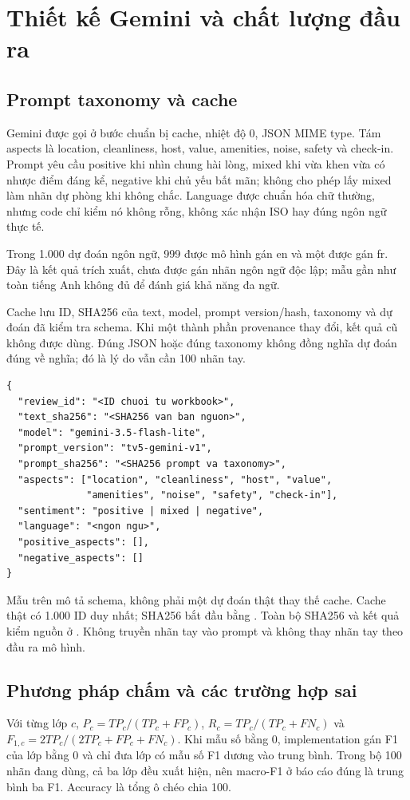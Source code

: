 \documentclass[11pt,a4paper]{article}
\begin{document}
\clearpage
\section{Thiết kế Gemini và chất lượng đầu ra}
\subsection{Prompt taxonomy và cache}
Gemini  được gọi ở bước chuẩn bị cache, nhiệt độ 0, JSON MIME type. Tám aspects là location, cleanliness, host, value, amenities, noise, safety và check-in. Prompt yêu cầu positive khi nhìn chung hài lòng, mixed khi vừa khen vừa có nhược điểm đáng kể, negative khi chủ yếu bất mãn; không cho phép lấy mixed làm nhãn dự phòng khi không chắc. Language được chuẩn hóa chữ thường, nhưng code chỉ kiểm nó không rỗng, không xác nhận ISO hay đúng ngôn ngữ thực tế.

Trong 1.000 dự đoán ngôn ngữ, 999 được mô hình gán en và một được gán fr. Đây là kết quả trích xuất, chưa được gán nhãn ngôn ngữ độc lập; mẫu gần như toàn tiếng Anh không đủ để đánh giá khả năng đa ngữ.

Cache lưu ID, SHA256 của text, model, prompt version/hash, taxonomy và dự đoán đã kiểm tra schema. Khi một thành phần provenance thay đổi, kết quả cũ không được dùng. Đúng JSON hoặc đúng taxonomy không đồng nghĩa dự đoán đúng về nghĩa; đó là lý do vẫn cần 100 nhãn tay.

\begin{Verbatim}[fontsize=\footnotesize,breaklines,breakanywhere,frame=single,rulecolor=\color{black!25}]
{
  "review_id": "<ID chuoi tu workbook>",
  "text_sha256": "<SHA256 van ban nguon>",
  "model": "gemini-3.5-flash-lite",
  "prompt_version": "tv5-gemini-v1",
  "prompt_sha256": "<SHA256 prompt va taxonomy>",
  "aspects": ["location", "cleanliness", "host", "value",
              "amenities", "noise", "safety", "check-in"],
  "sentiment": "positive | mixed | negative",
  "language": "<ngon ngu>",
  "positive_aspects": [],
  "negative_aspects": []
}
\end{Verbatim}
Mẫu trên mô tả schema, không phải một dự đoán thật thay thế cache. Cache thật có 1.000 ID duy nhất; SHA256 bắt đầu bằng \code{\CacheShortHash}. Toàn bộ SHA256 và kết quả kiểm nguồn ở . Không truyền nhãn tay vào prompt và không thay nhãn tay theo đầu ra mô hình.

\subsection{Phương pháp chấm và các trường hợp sai}
Với từng lớp $c$, $P_c=TP_c/(TP_c+FP_c)$, $R_c=TP_c/(TP_c+FN_c)$ và $F_{1,c}=2TP_c/(2TP_c+FP_c+FN_c)$. Khi mẫu số bằng 0, implementation gán F1 của lớp bằng 0 và chỉ đưa lớp có mẫu số F1 dương vào trung bình. Trong bộ 100 nhãn đang dùng, cả ba lớp đều xuất hiện, nên macro-F1 ở báo cáo đúng là trung bình ba F1. Accuracy là tổng ô chéo chia 100.
\end{document}
